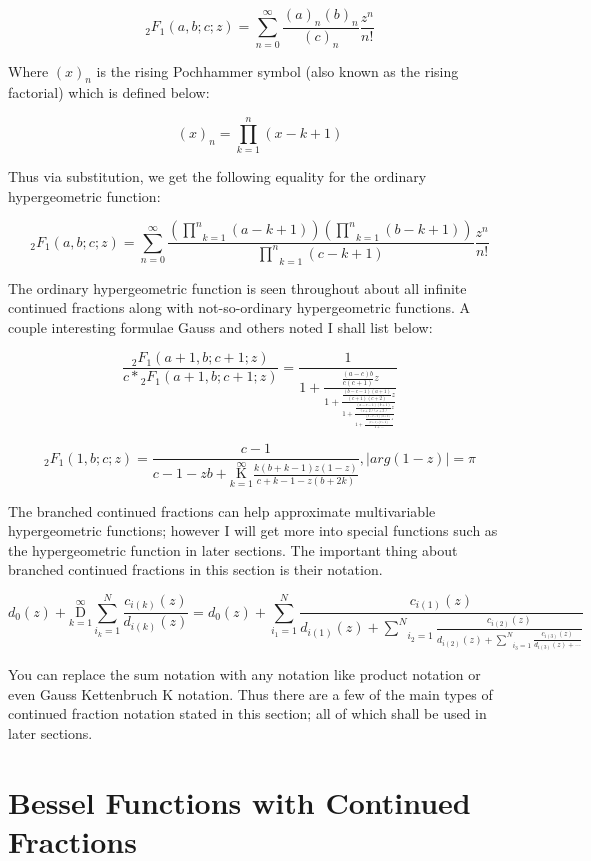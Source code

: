 \documentclass{article}
\begin{document}
$$ {}_2 F_1 (a,b;c;z) = \underset{n=0}{\overset{\infty}{\sum}} \frac{(a)_n (b)_n}{(c)_n}\frac{z^n}{n!}$$

Where $(x)_n$ is the rising Pochhammer symbol (also known as the rising factorial) which is defined below:

$$ (x)_n = \underset{k=1}{\overset{n}{\prod}} (x-k+1)$$

Thus via substitution, we get the following equality for the ordinary hypergeometric function:

$$ {}_2 F_1 (a,b;c;z) = \underset{n=0}{\overset{\infty}{\sum}} \frac{(\underset{k=1}{\overset{n}{\prod}} (a-k+1)) (\underset{k=1}{\overset{n}{\prod}} (b-k+1))}{\underset{k=1}{\overset{n}{\prod}} (c-k+1)}\frac{z^n}{n!}$$

The ordinary hypergeometric function is seen throughout about all infinite continued fractions along with not-so-ordinary hypergeometric functions. A couple interesting formulae Gauss and others noted I shall list below:

$$\frac{{}_2 F_1 (a+1,b;c+1;z)}{c*{}_2 F_1 (a+1,b;c+1;z)} = \frac{1}{1+\frac{\frac{(a-c)b}{c(c+1)}z}{1+\frac{\frac{(b-c-1)(a+1)}{(c+1)(c+2)}z}{1+\frac{\frac{(a-c-1)(b+1)}{(c+2)(c+3)}z}{1+\frac{\frac{(b-c-2)(a+2)}{(c+3)(c+4)}z}{1+\cdots}}}}}$$

$${}_2 F_1 (1,b;c;z) = \frac{c-1}{c-1-zb+ \underset{k=1}{\overset{\infty}{ \mathrm K}} \frac{k(b+k-1)z(1-z)}{c+k-1-z(b+2k)}}, |arg(1-z)|=\pi$$

The branched continued fractions can help approximate multivariable hypergeometric functions; however I will get more into special functions such as the hypergeometric function in later sections. The important thing about branched continued fractions in this section is their notation.

$$ d_0(z) + \underset{k=1}{\overset{\infty}{ \mathrm D}} \underset{i_k=1}{\overset{N}{ \sum}} \frac{c_{i(k)} (z)}{d_{i(k)} (z)} = d_0(z)  +\underset{i_1=1}{\overset{N}{ \sum}} \frac{c_{i(1)} (z)}{d_{i(1)} (z) + \underset{i_2=1}{\overset{N}{ \sum}} \frac{c_{i(2)} (z)}{d_{i(2)} (z) + \underset{i_3=1}{\overset{N}{ \sum}} \frac{c_{i(3)} (z)}{d_{i(3)} (z) + \cdots}}} $$

You can replace the sum notation with any notation like product notation or even Gauss Kettenbruch K notation. Thus there are a few of the main types of continued fraction notation stated in this section; all of which shall be used in later sections.

\section{Bessel Functions with Continued Fractions}
\end{document}
